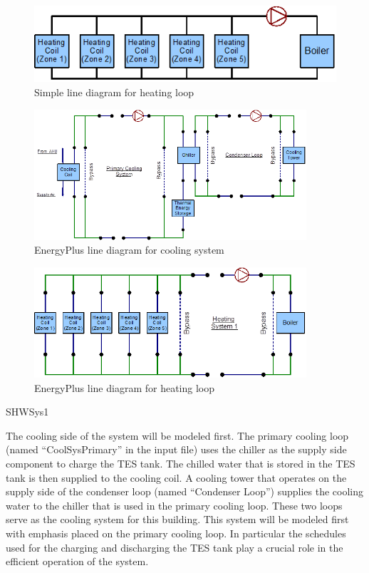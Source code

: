 \begin{figure}[htbp] %
\centering
\includegraphics{media/image042.png}
\caption{Simple line diagram for heating loop \protect \label{fig:simple-line-diagram-for-heating-loop}}
\end{figure}

\begin{figure}[hbtp] %
\centering
\includegraphics[width=0.9\textwidth, height=0.9\textheight, keepaspectratio=true]{media/image043.png}
\caption{EnergyPlus line diagram for cooling system \protect \label{fig:energyplus-line-diagram-for-cooling-system}}
\end{figure}

\begin{figure}[hbtp] %
\centering
\includegraphics[width=0.9\textwidth, height=0.9\textheight, keepaspectratio=true]{media/image044.png}
\caption{EnergyPlus line diagram for heating loop \protect \label{fig:energyplus-line-diagram-for-heating-loop}}
\end{figure}

SHWSys1

The cooling side of the system will be modeled first. The primary cooling loop (named ``CoolSysPrimary'' in the input file) uses the chiller as the supply side component to charge the TES tank. The chilled water that is stored in the TES tank is then supplied to the cooling coil. A cooling tower that operates on the supply side of the condenser loop (named ``Condenser Loop'') supplies the cooling water to the chiller that is used in the primary cooling loop. These two loops serve as the cooling system for this building. This system will be modeled first with emphasis placed on the primary cooling loop. In particular the schedules used for the charging and discharging the TES tank play a crucial role in the efficient operation of the system.

